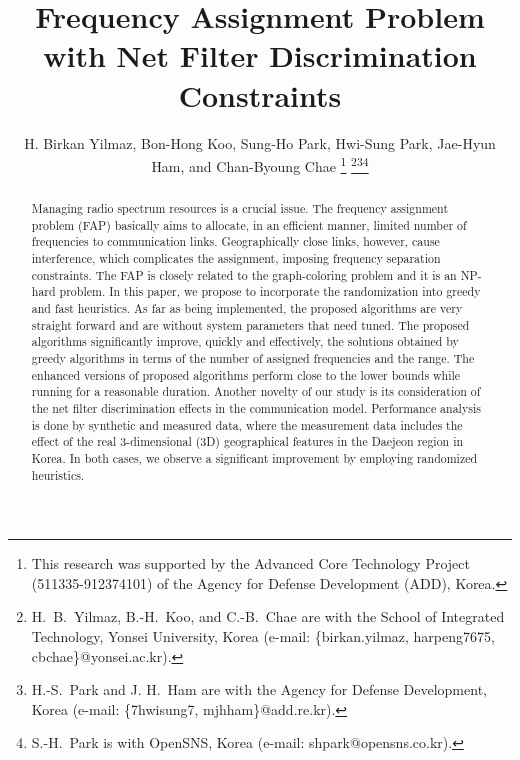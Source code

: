 \documentclass[10pt,twocolumn,twoside]{JCNtran}
\newcommand{\tbirkan}[1]{#1}
\begin{document}
\title{Frequency Assignment Problem with Net Filter Discrimination Constraints}
\author{H. Birkan Yilmaz, Bon-Hong Koo, Sung-Ho Park, Hwi-Sung Park, Jae-Hyun Ham, and Chan-Byoung Chae
\thanks{This research was supported by the Advanced Core Technology Project (511335-912374101) of the Agency for Defense Development (ADD), Korea.}
\thanks{H.~B.~Yilmaz, B.-H.~Koo, and C.-B.~Chae are with the School of Integrated Technology, Yonsei University, Korea (e-mail: \{birkan.yilmaz, harpeng7675, cbchae\}@yonsei.ac.kr).}\thanks{H.-S.~Park and J. H.~Ham are with the Agency for Defense Development, Korea (e-mail: \{7hwisung7, mjhham\}@add.re.kr).}\thanks{S.-H.~Park is with OpenSNS, Korea (e-mail: shpark@opensns.co.kr).}
} 


\maketitle



\begin{abstract}
Managing radio spectrum resources is a crucial issue. The frequency assignment problem (FAP) basically aims to allocate, in an efficient manner, limited number of frequencies to communication links. Geographically close links, however, cause interference, which complicates the assignment, imposing frequency separation constraints. The FAP is closely related to the graph-coloring problem and it is an NP-hard problem. \tbirkan{In this paper, we propose to incorporate the randomization into greedy and fast heuristics. As far as being implemented, the proposed algorithms are very straight forward and are without system parameters that need tuned.} The proposed algorithms significantly improve, quickly and effectively, the solutions \tbirkan{obtained by greedy algorithms} in terms of the number of assigned frequencies and the range. \tbirkan{The enhanced versions of proposed algorithms perform close to the lower bounds while running for a reasonable duration.} Another novelty of our study is its consideration of the net filter discrimination effects in the communication model. Performance analysis is done by synthetic and measured data, where the measurement data includes the effect of the real 3-dimensional (3D) geographical features in the Daejeon region in Korea. In both cases, we observe a significant improvement by employing randomized heuristics. 
\end{abstract}
\end{document}
